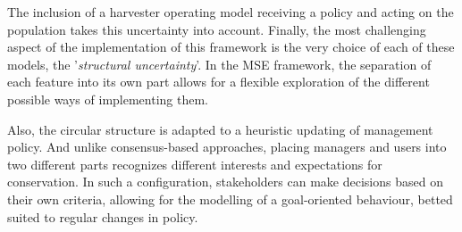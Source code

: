 \documentclass[12pt,a4paper]{article}
\begin{document}
The inclusion of a harvester operating model receiving a policy and acting on the population takes this uncertainty into account.
Finally, the most challenging aspect of the implementation of this framework is the very choice of each of these models, the '\textit{structural uncertainty}'.
In the MSE framework, the separation of each feature into its own part allows for a flexible exploration of the different possible ways of implementing them.

Also, the circular structure is adapted to a heuristic updating of management policy.
And unlike consensus-based approaches, placing managers and users into two different parts recognizes different interests and expectations for conservation.
In such a configuration, stakeholders can make decisions based on their own criteria, allowing for the modelling of a goal-oriented behaviour, betted suited to regular changes in policy.

\end{document}
